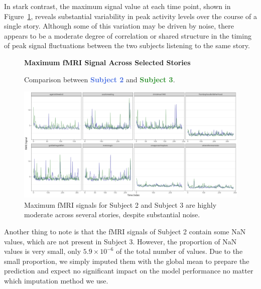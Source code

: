 \documentclass[10pt,letterpaper]{article}
\begin{document}
In stark contrast, the maximum signal value at each time point, shown in Figure~\ref{fig:max_signal}, reveals substantial variability in peak activity levels over the course of a single story. Although some of this variation may be driven by noise, there appears to be a moderate degree of correlation or shared structure in the timing of peak signal fluctuations between the two subjects listening to the same story.

\begin{figure}[ht]
    \centering
    \parbox{\textwidth}{\centering 
        \fontsize{13pt}{13pt}\selectfont \textbf{Maximum fMRI Signal Across Selected Stories}  

        {\fontsize{11pt}{13pt}\selectfont Comparison between \textcolor{RoyalBlue}{\textbf{Subject 2}} and \textcolor{ForestGreen}{\textbf{Subject 3}}.} 
    }
    \includegraphics[width=\textwidth]{figs/max_signal.png}
    \caption{Maximum fMRI signals for Subject 2 and Subject 3 are highly moderate across several stories, despite substantial noise.}
    \label{fig:max_signal}
\end{figure}

Another thing to note is that the fMRI signals of Subject 2 contain some NaN values, which are not present in Subject 3. However, the proportion of NaN values is very small, only \(5.9 \times 10^{-6}\) of the total number of values. Due to the small proportion, we simply imputed them with the global mean to prepare the prediction and expect no significant impact on the model performance no matter which imputation method we use.
\end{document}
